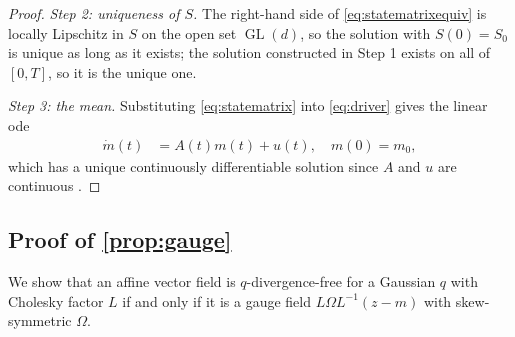 \documentclass{article} %
\newcommand{\gauge}{\Omega}
\newcommand{\gl}{\operatorname{GL}}
\begin{document}
\begin{proof}
\emph{Step 2: uniqueness of $S$.} The right-hand side of \cref{eq:statematrixequiv} is locally Lipschitz in $S$ on the open set $\gl(d)$, so the solution with $S(0) = S_0$ is unique as long as it exists; the solution constructed in Step 1 exists on all of $[0, T]$, so it is the unique one.

\emph{Step 3: the mean.} Substituting \cref{eq:statematrix} into \cref{eq:driver} gives the linear \gls{ode}
\begin{align*}
    \dot m(t) &= A(t) m(t) + u(t), \quad m(0) = m_0,
\end{align*}
which has a unique continuously differentiable solution since $A$ and $u$ are continuous \citep{Särkkä_Solin_2019}.
\end{proof}

\subsection{Proof of \texorpdfstring{\cref{prop:gauge}}{Proposition 2}}\label{sec:proofgauge}

We show that an affine vector field is $q$-divergence-free for a Gaussian $q$ with Cholesky factor $L$ if and only if it is a gauge field $L \gauge L^{-1}(z - m)$ with skew-symmetric $\gauge$.
\end{document}
